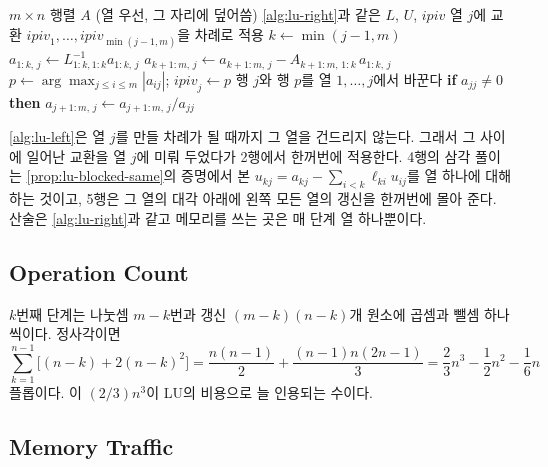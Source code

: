 \begin{algorithm}[t]
\begin{algorithmic}[1]
\Require $m\times n$ 행렬 $A$ (열 우선, 그 자리에 덮어씀)
\Ensure \cref{alg:lu-right}과 같은 $L$, $U$, $\mathit{ipiv}$
  \State 열 $j$에 교환 $\mathit{ipiv}_1,\dots,\mathit{ipiv}_{\min(j-1,m)}$을 차례로 적용 
  \State $k\gets\min(j-1,m)$
  \State $a_{1:k,\,j}\gets L_{1:k,1:k}^{-1}a_{1:k,\,j}$ 
  \State $a_{k+1:m,\,j}\gets a_{k+1:m,\,j}-A_{k+1:m,\,1:k}\,a_{1:k,\,j}$ 
    \State $p\gets\arg\max_{j\le i\le m}|a_{ij}|$; $\mathit{ipiv}_j\gets p$
    \State 행 $j$와 행 $p$를 열 $1,\dots,j$에서 바꾼다 
    \State \textbf{if} $a_{jj}\ne0$ \textbf{then} $a_{j+1:m,\,j}\gets a_{j+1:m,\,j}/a_{jj}$
  \EndIf
\EndFor
\end{algorithmic}
\caption{부분 피벗을 쓰는 왼쪽 보기 LU ($jki$ 꼴)}
\label{alg:lu-left}
\end{algorithm}

\cref{alg:lu-left}은 열 $j$를 만들 차례가 될 때까지 그 열을 건드리지 않는다. 그래서 그 사이에 일어난 교환을 열 $j$에 미뤄 두었다가 2행에서 한꺼번에 적용한다. 4행의 삼각 풀이는 \cref{prop:lu-blocked-same}의 증명에서 본 $u_{kj}=a_{kj}-\sum_{i<k}\ell_{ki}u_{ij}$를 열 하나에 대해 하는 것이고, 5행은 그 열의 대각 아래에 왼쪽 모든 열의 갱신을 한꺼번에 몰아 준다. 산술은 \cref{alg:lu-right}과 같고 메모리를 쓰는 곳은 매 단계 열 하나뿐이다.

\subsection{Operation Count}

$k$번째 단계는 나눗셈 $m-k$번과 갱신 $(m-k)(n-k)$개 원소에 곱셈과 뺄셈 하나씩이다. 정사각이면
\[
\sum_{k=1}^{n-1}\bigl[(n-k)+2(n-k)^2\bigr]=\frac{n(n-1)}2+\frac{(n-1)n(2n-1)}3=\frac23n^3-\frac12n^2-\frac16n
\]
플롭이다. 이 $(2/3)n^3$이 LU의 비용으로 늘 인용되는 수이다.

\subsection{Memory Traffic}

